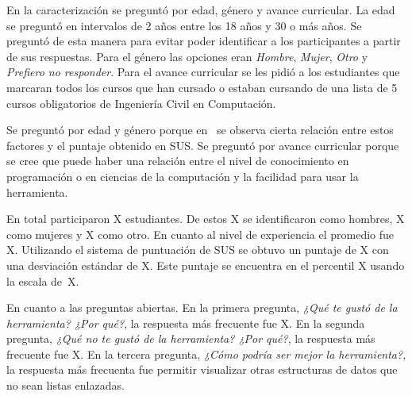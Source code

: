 En la caracterización se preguntó por edad, género y avance curricular. La edad se preguntó en intervalos de 2 años entre los 18 años y 30 o más años. Se preguntó de esta manera para evitar poder identificar a los participantes a partir de sus respuestas. Para el género las opciones eran \textit{Hombre}, \textit{Mujer}, \textit{Otro} y \textit{Prefiero no responder}. Para el avance curricular se les pidió a los estudiantes que marcaran todos los cursos que han cursado o estaban cursando de una lista de 5 cursos obligatorios de Ingeniería Civil en Computación.

Se preguntó por edad y género porque en~\cite{evaluation-of-sus} se observa cierta relación entre estos factores y el puntaje obtenido en SUS. Se preguntó por avance curricular porque se cree que puede haber una relación entre el nivel de conocimiento en programación o en ciencias de la computación y la facilidad para usar la herramienta.

En total participaron X estudiantes. De estos X se identificaron como hombres, X como mujeres y X como otro. En cuanto al nivel de experiencia el promedio fue X. Utilizando el sistema de puntuación de SUS se obtuvo un puntaje de X con una desviación estándar de X. Este puntaje se encuentra en el percentil X usando la escala de~X.

En cuanto a las preguntas abiertas. En la primera pregunta, \textit{¿Qué te gustó de la herramienta? ¿Por qué?}, la respuesta más frecuente fue X. En la segunda pregunta, \textit{¿Qué no te gustó de la herramienta? ¿Por qué?}, la respuesta más frecuente fue X. En la tercera pregunta, \textit{¿Cómo podría ser mejor la herramienta?}, la respuesta más frecuenta fue permitir visualizar otras estructuras de datos que no sean listas enlazadas.


